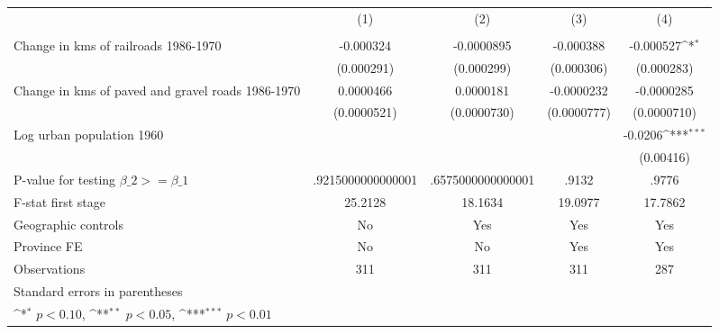 {
\def\sym#1{\ifmmode^{#1}\else\(^{#1}\)\fi}
\begin{tabular}{l*{4}{c}}
\hline\hline
                &\multicolumn{1}{c}{(1)}&\multicolumn{1}{c}{(2)}&\multicolumn{1}{c}{(3)}&\multicolumn{1}{c}{(4)}\\
                &\multicolumn{1}{c}{}&\multicolumn{1}{c}{}&\multicolumn{1}{c}{}&\multicolumn{1}{c}{}\\
\hline
Change in kms of railroads 1986-1970&-0.000324         &-0.0000895         &-0.000388         &-0.000527\sym{*}  \\
                &(0.000291)         &(0.000299)         &(0.000306)         &(0.000283)         \\
[1em]
Change in kms of paved and gravel roads 1986-1970&0.0000466         &0.0000181         &-0.0000232         &-0.0000285         \\
                &(0.0000521)         &(0.0000730)         &(0.0000777)         &(0.0000710)         \\
[1em]
Log urban population 1960&                  &                  &                  &  -0.0206\sym{***}\\
                &                  &                  &                  &(0.00416)         \\
\hline
P-value for testing $\beta\_{2} >= \beta\_{1}$&.9215000000000001         &.6575000000000001         &    .9132         &    .9776         \\
F-stat first stage&  25.2128         &  18.1634         &  19.0977         &  17.7862         \\
Geographic controls&       No         &      Yes         &      Yes         &      Yes         \\
Province FE     &       No         &       No         &      Yes         &      Yes         \\
Observations    &      311         &      311         &      311         &      287         \\
\hline\hline
\multicolumn{5}{l}{\footnotesize Standard errors in parentheses}\\
\multicolumn{5}{l}{\footnotesize \sym{*} \(p<0.10\), \sym{**} \(p<0.05\), \sym{***} \(p<0.01\)}\\
\end{tabular}
}
